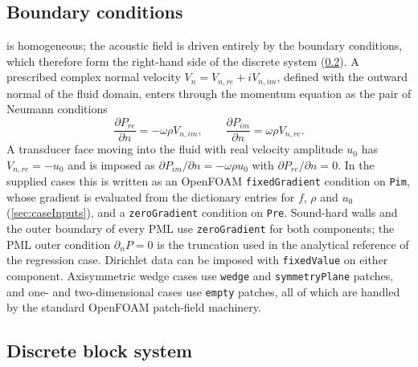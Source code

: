 \documentclass[final,12pt,nopreprintline]{elsarticle}
\newcommand{\code}[1]{\texttt{#1}}
\begin{document}
\subsection{Boundary conditions}
\label{sec:boundaryConditions}

 is homogeneous; the acoustic field is driven entirely by the
boundary conditions, which therefore form the right-hand side of the discrete
system (\cref{sec:blockSystem}).  A prescribed complex normal velocity
$V_n=V_{n,re}+iV_{n,im}$, defined with the outward normal of the fluid domain,
enters through the momentum equation as the pair of Neumann conditions
\begin{equation}
    \frac{\partial P_{re}}{\partial n}=-\omega\rho V_{n,im},
    \qquad
    \frac{\partial P_{im}}{\partial n}=\omega\rho V_{n,re}.
    \label{eq:velocityBC}
\end{equation}
A transducer face moving into the fluid with real velocity amplitude $u_0$ has
$V_{n,re}=-u_0$ and is imposed as $\partial P_{im}/\partial n=-\omega\rho u_0$
with $\partial P_{re}/\partial n=0$.  In the supplied cases this is written as
an OpenFOAM \code{fixedGradient} condition on \code{Pim}, whose gradient is
evaluated from the dictionary entries for $f$, $\rho$ and $u_0$
(\cref{sec:caseInputs}), and a \code{zeroGradient} condition on \code{Pre}.
Sound-hard walls and the outer boundary of every PML use \code{zeroGradient}
for both components; the PML outer condition $\partial_n P=0$ is the truncation
used in the analytical reference of the regression case.  Dirichlet data can
be imposed with \code{fixedValue} on either component.  Axisymmetric wedge
cases use \code{wedge} and \code{symmetryPlane} patches, and one- and
two-dimensional cases use \code{empty} patches, all of which are handled by
the standard OpenFOAM patch-field machinery.

\subsection{Discrete block system}
\label{sec:blockSystem}
\end{document}
